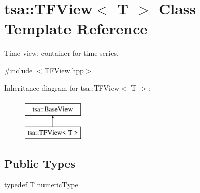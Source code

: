 \hypertarget{classtsa_1_1_t_f_view}{}\section{tsa\+:\+:T\+F\+View$<$ T $>$ Class Template Reference}
\label{classtsa_1_1_t_f_view}


Time view\+: container for time series.  




{\ttfamily \#include $<$T\+F\+View.\+hpp$>$}

Inheritance diagram for tsa\+:\+:T\+F\+View$<$ T $>$\+:\begin{figure}[H]
\begin{center}
\leavevmode
\includegraphics[height=2.000000cm]{classtsa_1_1_t_f_view}
\end{center}
\end{figure}
\subsection*{Public Types}
\begin{DoxyCompactItemize}
\item 
typedef T \hyperlink{classtsa_1_1_t_f_view_a9dcd740f5d29edefd0a181917a9c700b}{numeric\+Type}
\end{DoxyCompactItemize}
